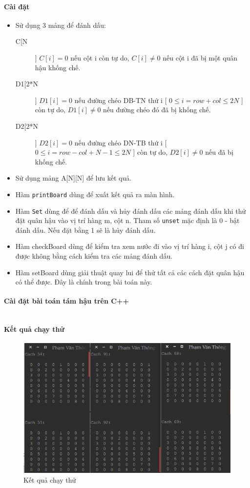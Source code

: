 \documentclass[a4paper,12pt]{report}
\newcommand{\mnt}[1]{\inputminted[frame=single, linenos=true, tabsize=4]{c++}{#1}}
\begin{document}
\paragraph{Cài đặt}
\begin{itemize}
\item Sử dụng 3 mảng để đánh dấu:
\begin{description}
\item [C[N]] $C[i] = 0$ nếu cột i còn tự do, $C[i] \neq 0$ nếu cột i đã bị một quân hậu khống chế.
\item [D1[2*N]] $D1[i] = 0$ nếu đường chéo DB-TN thứ i [ $0 \le i = row + col \le 2N$ ] còn tự do, $D1[i] \neq 0$ nếu đường chéo đó đã bị khống chế.
\item [D2[2*N]] $D2[i] = 0$ nếu đường chéo DN-TB thứ i [ $0 \le i = row - col + N - 1 \le 2N$ ] còn tự do, $D2[i] \neq 0$ nếu đã bị khống chế.
\end{description}
\item Sử dụng mảng A[N][N] để lưu kết quả.
\item Hàm \texttt{printBoard} dùng để xuất kết quả ra màn hình.
\item Hàm \texttt{Set} dùng để để đánh dấu và hủy đánh dấu các mảng đánh dấu khi thử đặt quân hậu vào vị trí hàng m, cột n. Tham số \texttt{unset} mặc định là 0 - bật đánh dấu. Nếu đặt bằng 1 sẽ là hủy đánh dấu.
\item Hàm checkBoard dùng để kiểm tra xem nước đi vào vị trí hàng i, cột j có đi được không bằng cách kiểm tra các mảng đánh dấu.
\item Hàm setBoard dùng giải thuật quay lui để thử tất cả các cách đặt quân hậu có thể được. Đây là chính trong bài toán này.
\end{itemize}

\paragraph {Cài đặt bài toán tám hậu trên C++}

\mnt{src/queen.cpp}

\paragraph {Kết quả chạy thử}
\begin{figure}[htp]
\centering
\includegraphics[scale=0.50]{img/queen.png}
\caption{Kết quả chạy thử}
\label{}
\end{figure}
\end{document}
